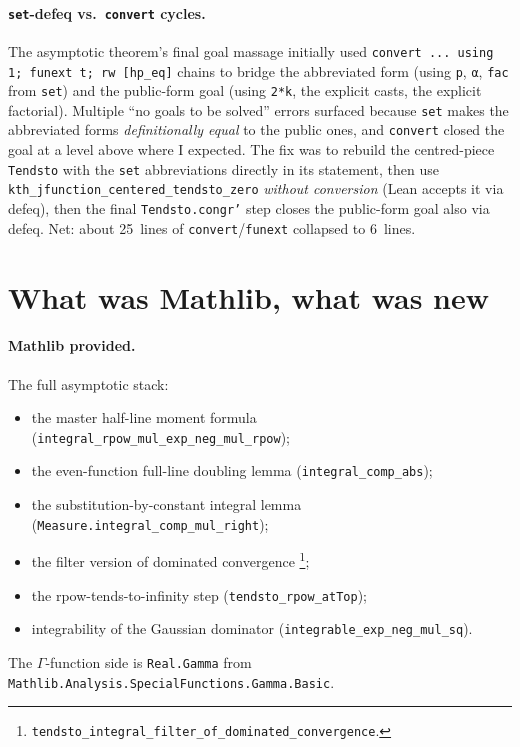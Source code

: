 \documentclass[11pt]{article}
\begin{document}
\paragraph{\texttt{set}-defeq vs.\ \texttt{convert} cycles.} The
asymptotic theorem's final goal massage initially used
\texttt{convert ... using 1; funext t; rw [hp\_eq]} chains to
bridge the abbreviated form (using \texttt{p}, \texttt{α},
\texttt{fac} from \texttt{set}) and the public-form goal (using
\texttt{2*k}, the explicit casts, the explicit factorial). Multiple
``no goals to be solved'' errors surfaced because
\texttt{set} makes the abbreviated forms \emph{definitionally equal}
to the public ones, and \texttt{convert} closed the goal at a level
above where I expected. The fix was to rebuild the centred-piece
\texttt{Tendsto} with the \texttt{set} abbreviations directly in
its statement, then use \texttt{kth\_jfunction\_centered\_tendsto\_zero}
\emph{without conversion} (Lean accepts it via defeq), then the
final \texttt{Tendsto.congr'} step closes the public-form goal also
via defeq. Net: about 25~lines of \texttt{convert}/\texttt{funext}
collapsed to 6~lines.

\section{What was Mathlib, what was new}

\paragraph{Mathlib provided.} The full asymptotic stack:
\begin{itemize}[leftmargin=1em,itemsep=0.1em,topsep=0.1em]
\item the master half-line moment formula
  (\texttt{integral\_rpow\_mul\_exp\_neg\_mul\_rpow});
\item the even-function full-line doubling lemma
  (\texttt{integral\_comp\_abs});
\item the substitution-by-constant integral lemma
  (\texttt{Measure.integral\_comp\_mul\_right});
\item the filter version of dominated convergence%
  \footnote{\texttt{tendsto\_integral\_filter\_of\_dominated\_convergence}.};
\item the rpow-tends-to-infinity step (\texttt{tendsto\_rpow\_atTop});
\item integrability of the Gaussian dominator
  (\texttt{integrable\_exp\_neg\_mul\_sq}).
\end{itemize}
The $\Gamma$-function side is \texttt{Real.Gamma} from
\texttt{Mathlib.Analysis.SpecialFunctions.Gamma.Basic}.
\end{document}
